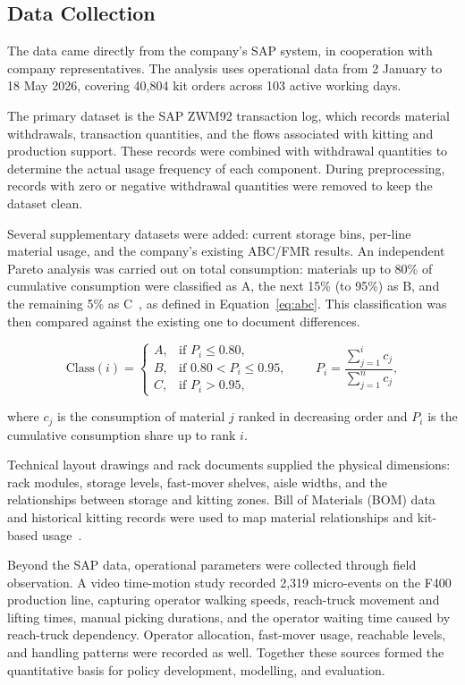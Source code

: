 \documentclass[conference]{IEEEtran}
\begin{document}
\subsection{Data Collection}
The data came directly from the company's SAP system, in cooperation with
company representatives. The analysis uses operational data from 2 January to
18 May 2026, covering 40{,}804 kit orders across 103 active working days.

The primary dataset is the SAP ZWM92 transaction log, which records material
withdrawals, transaction quantities, and the flows associated with kitting and
production support. These records were combined with withdrawal quantities to
determine the actual usage frequency of each component. During preprocessing,
records with zero or negative withdrawal quantities were removed to keep the
dataset clean.

Several supplementary datasets were added: current storage bins, per-line
material usage, and the company's existing ABC/FMR results. An independent
Pareto analysis was carried out on total consumption: materials up to 80\% of
cumulative consumption were classified as A, the next 15\% (to 95\%) as B, and
the remaining 5\% as C~\cite{flores1986,law2015}, as defined in
Equation~\eqref{eq:abc}. This classification was then compared against the
existing one to document differences.

\begin{equation}
\label{eq:abc}
\mathrm{Class}(i)=
\begin{cases}
A, & \text{if } P_i \le 0.80,\\[2pt]
B, & \text{if } 0.80 < P_i \le 0.95,\\[2pt]
C, & \text{if } P_i > 0.95,
\end{cases}
\qquad
P_i=\frac{\sum_{j=1}^{i} c_j}{\sum_{j=1}^{n} c_j},
\end{equation}

\noindent where $c_j$ is the consumption of material $j$ ranked in decreasing
order and $P_i$ is the cumulative consumption share up to rank $i$.

Technical layout drawings and rack documents supplied the physical
dimensions: rack modules, storage levels, fast-mover shelves, aisle widths,
and the relationships between storage and kitting zones. Bill of Materials
(BOM) data and historical kitting records were used to map material
relationships and kit-based usage~\cite{bartholdi2014}.

Beyond the SAP data, operational parameters were collected through field
observation. A video time-motion study recorded 2{,}319 micro-events on the
F400 production line, capturing operator walking speeds, reach-truck movement
and lifting times, manual picking durations, and the operator waiting time
caused by reach-truck dependency. Operator allocation, fast-mover usage,
reachable levels, and handling patterns were recorded as well. Together these
sources formed the quantitative basis for policy development, modelling, and
evaluation.
\end{document}
